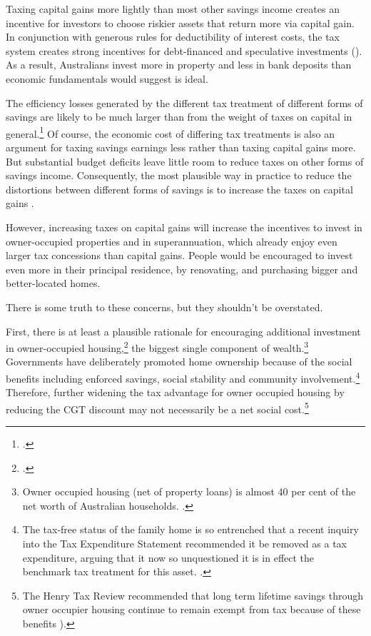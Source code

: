\documentclass{grattanAlpha}\usepackage[]{graphicx}\usepackage[]{color}
\begin{document}
Taxing capital gains more lightly than most other savings income creates an incentive for investors to choose riskier assets that return more via capital gain. In conjunction with generous rules for deductibility of interest costs, the tax system creates strong incentives for debt-financed and speculative investments (). As a result, Australians invest more in property and less in bank deposits than economic fundamentals would suggest is ideal.

The efficiency losses generated by the different tax treatment of different forms of savings are likely to be much larger than from the weight of taxes on capital in general.\footcites[][16]{Ingles2009TaxEquity}[][22]{Ingles2015}  Of course, the economic cost of differing tax treatments is also an argument for taxing savings earnings less rather than taxing capital gains more. But substantial budget deficits leave little room to reduce taxes on other forms of savings income. Consequently, the most plausible way in practice to reduce the distortions between different forms of savings is to increase the taxes on capital gains . 

However, increasing taxes on capital gains will increase the incentives to invest in owner-occupied properties and in superannuation, which already enjoy even larger tax concessions than capital gains. People would be encouraged to invest even more in their principal residence, by renovating, and purchasing bigger and better-located homes. 

There is some truth to these concerns, but they shouldn’t be overstated. 

First, there is at least a plausible rationale\label{subsubsect:plausible-rational-for-encouraging-investment-in-owner-occupied-housing}
 for encouraging additional investment in owner-occupied housing,\footcite[][43--45]{DaleyMcGannonSavage2013} the biggest single component of wealth.\footnote{Owner occupied housing (net of property loans) is almost 40 per cent of the net worth of Australian households. \textcite[See:][]{ABS2015HousingFinance}.} Governments have deliberately promoted home ownership because of the social benefits including enforced savings, social stability and community involvement.\footnote{The tax-free status of the family home is so entrenched that a recent inquiry into the Tax Expenditure Statement recommended it be removed as a tax expenditure, arguing that it now so unquestioned it is in effect the benchmark tax treatment for this asset. \textcite[][42]{HouseOfRepresentativesStandingCommitteeonTaxRevenue2015TES}.} Therefore, further widening the tax advantage for owner occupied housing by reducing the CGT discount may not necessarily be a net social cost.\footnote{The Henry Tax Review recommended that long term lifetime savings through owner occupier housing continue to remain exempt from tax because of these benefits \textcite[][Part A, p.~4]{HenryTaxReview2010}).}
\end{document}
